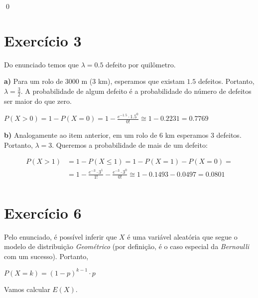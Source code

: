 \documentclass[12pt,letterpaper]{article}
\begin{document}
	\qed
	
	\section*{Exercício 3}
	
	Do enunciado temos que $\lambda = 0.5$ defeito por quilômetro.
	
	\textbf{a)} Para um rolo de $3000$ m ($3$ km), esperamos que existam $1.5$ defeitos. Portanto, $\lambda = \frac{3}{2}$. A probabilidade de algum defeito é a probabilidade do número de defeitos ser maior do que zero.
	
	\begin{center}
		$P(X>0) = 1 - P(X=0) = 1 - \frac{e^{-1.5}\cdot 1.5^0}{0!} \cong 1 - 0.2231 = 0.7769$
	\end{center} 
	
	\textbf{b)} Analogamente ao item anterior, em um rolo de $6$ km esperamos $3$ defeitos. Portanto, $\lambda = 3$. Queremos a probabilidade de mais de um defeito:
	
	\begin{equation*}
		\begin{split}
			P(X>1) & =   1 - P(X \leq 1) = 1 - P(X=1) - P(X=0) = \\
			& = 1 - \frac{e^{-3}\cdot 3^1}{1!} - \frac{e^{-3}\cdot 3^0}{0!} \cong 1 - 0.1493 - 0.0497 = 0.0801\\ 
		\end{split}
	\end{equation*}
	
	\section*{Exercício 6}
	
	Pelo enunciado, é possível inferir que $X$ é uma variável aleatória que segue o modelo de distribuição \textit{Geométrico} (por definição, é o caso especial da \textit{Bernoulli} com um sucesso). Portanto, 
	
	\begin{center}
		$P(X=k) = (1-p)^{k-1} \cdot p$
	\end{center}
	
	Vamos calcular $E(X)$. 
	
\end{document}
